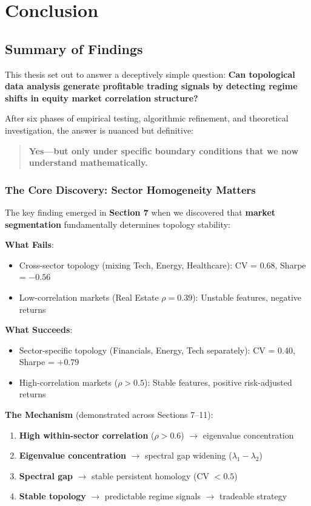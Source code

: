 \section{Conclusion}
\label{sec:conclusion}

\subsection{Summary of Findings}

This thesis set out to answer a deceptively simple question: \textbf{Can topological data analysis generate profitable trading signals by detecting regime shifts in equity market correlation structure?}

After six phases of empirical testing, algorithmic refinement, and theoretical investigation, the answer is nuanced but definitive:

\begin{quote}
\textbf{Yes---but only under specific boundary conditions that we now understand mathematically.}
\end{quote}

\subsubsection{The Core Discovery: Sector Homogeneity Matters}

The key finding emerged in \textbf{Section 7} when we discovered that \textbf{market segmentation} fundamentally determines topology stability:

\textbf{What Fails}:
\begin{itemize}
\item Cross-sector topology (mixing Tech, Energy, Healthcare): CV = 0.68, Sharpe = $-0.56$
\item Low-correlation markets (Real Estate $\rho = 0.39$): Unstable features, negative returns
\end{itemize}

\textbf{What Succeeds}:
\begin{itemize}
\item Sector-specific topology (Financials, Energy, Tech separately): CV = 0.40, Sharpe = $+0.79$
\item High-correlation markets ($\rho > 0.5$): Stable features, positive risk-adjusted returns
\end{itemize}

\textbf{The Mechanism} (demonstrated across Sections 7--11):
\begin{enumerate}
\item \textbf{High within-sector correlation} ($\rho > 0.6$) $\rightarrow$ eigenvalue concentration
\item \textbf{Eigenvalue concentration} $\rightarrow$ spectral gap widening ($\lambda_1 - \lambda_2$)
\item \textbf{Spectral gap} $\rightarrow$ stable persistent homology (CV $< 0.5$)
\item \textbf{Stable topology} $\rightarrow$ predictable regime signals $\rightarrow$ tradeable strategy
\end{enumerate}

